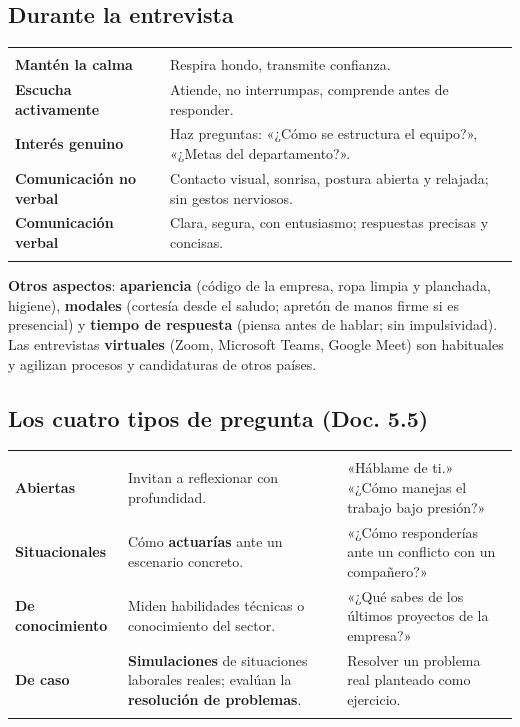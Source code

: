 \subsection{Durante la entrevista}
\begin{tabla}
\begin{tabularx}{\textwidth}{@{}>{\bfseries}p{3.4cm} Y@{}}
 &  \\
\midrule
Mantén la calma & Respira hondo, transmite confianza. \\
Escucha activamente & Atiende, no interrumpas, comprende antes de responder. \\
Interés genuino & Haz preguntas: «¿Cómo se estructura el equipo?», «¿Metas del departamento?». \\
Comunicación no verbal & Contacto visual, sonrisa, postura abierta y relajada; sin gestos nerviosos. \\
Comunicación verbal & Clara, segura, con entusiasmo; respuestas precisas y concisas. \\
\bottomrule
\end{tabularx}
\end{tabla}
\textbf{Otros aspectos}: \textbf{apariencia} (código de la empresa, ropa limpia y planchada, higiene), \textbf{modales} (cortesía desde el saludo; apretón de manos firme si es presencial) y \textbf{tiempo de respuesta} (piensa antes de hablar; sin impulsividad). Las entrevistas \textbf{virtuales} (Zoom, Microsoft Teams, Google Meet) son habituales y agilizan procesos y candidaturas de otros países.

\subsection{Los cuatro tipos de pregunta (Doc. 5.5)}
\begin{tabla}
\begin{tabularx}{\textwidth}{@{}>{\bfseries}p{2.8cm} Y Y@{}}
 &  &  \\
\midrule
Abiertas & Invitan a reflexionar con profundidad. & «Háblame de ti.» «¿Cómo manejas el trabajo bajo presión?» \\
Situacionales & Cómo \textbf{actuarías} ante un escenario concreto. & «¿Cómo responderías ante un conflicto con un compañero?» \\
De conocimiento & Miden habilidades técnicas o conocimiento del sector. & «¿Qué sabes de los últimos proyectos de la empresa?» \\
De caso & \textbf{Simulaciones} de situaciones laborales reales; evalúan la \textbf{resolución de problemas}. & Resolver un problema real planteado como ejercicio. \\
\bottomrule
\end{tabularx}
\end{tabla}

